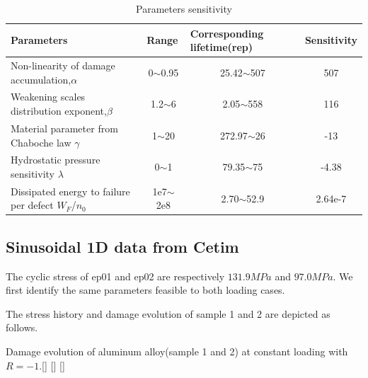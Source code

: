 \documentclass[3p,times,number,review]{elsarticle}
\begin{document}
\begin{table}[]
	\centering
	\begin{tabular}{l|c|c|c}
		\hline
		\textbf{Parameters}                                  & \multicolumn{1}{l|}{\textbf{Range}} & \multicolumn{1}{l|}{\textbf{Corresponding lifetime(rep)}} & \multicolumn{1}{l}{\textbf{Sensitivity}} \\ \hline
		Non-linearity of damage accumulation,$\alpha$        & 0$\sim$0.95                         & 25.42$\sim$507                                         & 507                                   \\
		Weakening scales distribution exponent,$\beta$       & 1.2$\sim$6                          & 2.05$\sim$558                                          & 116                                   \\
		Material parameter from Chaboche law   $\gamma$      & 1$\sim$20                           & 272.97$\sim$26                                        & -13                                      \\
		Hydrostatic pressure sensitivity $\lambda$           & 0$\sim$1                            & 79.35$\sim$75                                     & -4.38                                    \\
		Dissipated energy to failure per defect  $W_F$/$n_0$ & 1e7$\sim$2e8                        & 2.70$\sim$52.9                                          & 2.64e-7                                  \\ \hline
	\end{tabular}
	\caption{Parameters sensitivity}
\label{sensitivity}
\end{table}

\subsection{Sinusoidal 1D data from Cetim}
The cyclic stress of ep01 and ep02 are respectively $131.9MPa$ and $97.0MPa$. We first identify the same parameters feasible to both loading cases.


The stress history and damage evolution of sample 1 and 2 are depicted as follows.
\begin{Figure}[h!]{Damage evolution of aluminum alloy(sample 1 and 2) at constant loading with $R=-1$.}[]
[]
[]
\end{Figure}

\newpage
\end{document}
